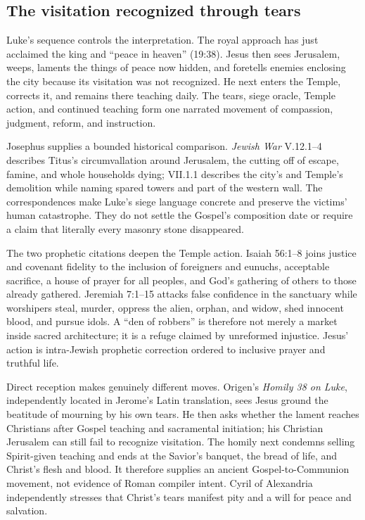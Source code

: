 \begin{deepstudy}
\sectionguard
\subsection*{The visitation recognized through tears\enspace{}}

Luke's sequence controls the interpretation. The royal approach has just acclaimed the king and ``peace in heaven'' (19:38). Jesus then sees Jerusalem, weeps, laments the things of peace now hidden, and foretells enemies enclosing the city because its visitation was not recognized. He next enters the Temple, corrects it, and remains there teaching daily. The tears, siege oracle, Temple action, and continued teaching form one narrated movement of compassion, judgment, reform, and instruction.

Josephus supplies a bounded historical comparison. \emph{Jewish War} V.12.1--4 describes Titus's circumvallation around Jerusalem, the cutting off of escape, famine, and whole households dying; VII.1.1 describes the city's and Temple's demolition while naming spared towers and part of the western wall. The correspondences make Luke's siege language concrete and preserve the victims' human catastrophe. They do not settle the Gospel's composition date or require a claim that literally every masonry stone disappeared.

The two prophetic citations deepen the Temple action. Isaiah 56:1--8 joins justice and covenant fidelity to the inclusion of foreigners and eunuchs, acceptable sacrifice, a house of prayer for all peoples, and God's gathering of others to those already gathered. Jeremiah 7:1--15 attacks false confidence in the sanctuary while worshipers steal, murder, oppress the alien, orphan, and widow, shed innocent blood, and pursue idols. A ``den of robbers'' is therefore not merely a market inside sacred architecture; it is a refuge claimed by unreformed injustice. Jesus' action is intra-Jewish prophetic correction ordered to inclusive prayer and truthful life.

Direct reception makes genuinely different moves. Origen's \emph{Homily 38 on Luke}, independently located in Jerome's Latin translation, sees Jesus ground the beatitude of mourning by his own tears. He then asks whether the lament reaches Christians after Gospel teaching and sacramental initiation; his Christian Jerusalem can still fail to recognize visitation. The homily next condemns selling Spirit-given teaching and ends at the Savior's banquet, the bread of life, and Christ's flesh and blood. It therefore supplies an ancient Gospel-to-Communion movement, not evidence of Roman compiler intent. Cyril of Alexandria independently stresses that Christ's tears manifest pity and a will for peace and salvation.


\end{deepstudy}
